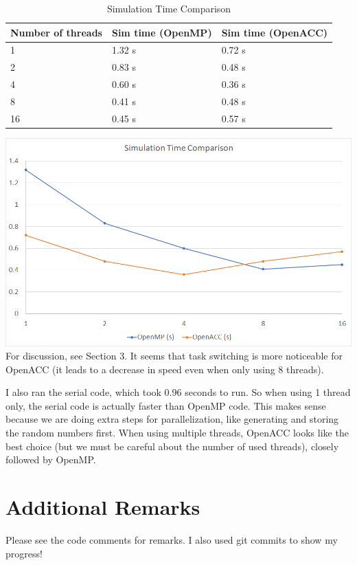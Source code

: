 \documentclass[12pt]{article}
\begin{document}
\begin{table}[H]
\centering
\caption{Simulation Time Comparison}
\label{my-label}
\begin{tabular}{@{}lll@{}}
\toprule
Number of threads & Sim time (OpenMP) & Sim time (OpenACC) \\ \midrule
1                 & 1.32 s            & 0.72 s             \\
2                 & 0.83 s            & 0.48 s             \\
4                 & 0.60 s            & 0.36 s             \\
8                 & 0.41 s            & 0.48 s             \\
16                & 0.45 s            & 0.57 s             \\ \bottomrule
\end{tabular}
\end{table}

\includegraphics[width=\textwidth]{graph}\\

For discussion, see Section 3. It seems that task switching is more noticeable
for OpenACC (it leads to a decrease in speed even when only using 8 threads).

I also ran the serial code, which took 0.96 seconds to run. So when using 1
thread only, the serial code is actually faster than OpenMP code. This makes
sense because we are doing extra steps for parallelization, like generating and
storing the random numbers first. When using multiple threads, OpenACC looks
like the best choice (but we must be careful about the number of used threads),
closely followed by OpenMP.

\section{Additional Remarks}

Please see the code comments for remarks. I also used git commits to show my
progress!
\end{document}

